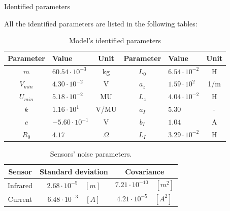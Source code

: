 \begin{frame}{Identified parameters}

    All the identified parameters are listed in the following tables:

    \begin{table}[H]
        \centering
        \begin{tabular}{|c|l|c||c|l|c|}
            \hline
            \textbf{Parameter} & \textbf{Value}        & \textbf{Unit} & \textbf{Parameter} & \textbf{Value}       & \textbf{Unit} \\
            \hline
            $m$                & $60.54 \cdot 10^{-3}$ & kg            & $L_{0}$            & $6.54 \cdot 10^{-2}$ & H             \\
            $V_{min}$          & $4.30 \cdot 10^{-2}$  & V             & $a_{z}$            & $1.59 \cdot 10^{2}$  & 1/m           \\
            $U_{min}$          & $5.18 \cdot 10^{-2}$  & MU            & $L_{z}$            & $4.04 \cdot 10^{-2}$ & H             \\
            $k$                & $1.16 \cdot 10^{1}$   & V/MU          & $a_{I}$            & $5.30$               & -             \\
            $c$                & $-5.60 \cdot 10^{-1}$ & V             & $b_{I}$            & $1.04$               & A             \\
            $R_{0}$            & $4.17$                & $\Omega$      & $L_{I}$            & $3.29 \cdot 10^{-2}$ & H             \\
            \hline
        \end{tabular}

        \caption{Model's identified parameters}
    \end{table}

    \begin{table}[H]
        \centering

        \begin{tabular}{|c|c|c|}
            \hline
            \textbf{Sensor} & \textbf{Standard deviation}    & \textbf{Covariance}               \\
            \hline
            Infrared        & $2.68 \cdot 10^{-5} \quad [m]$ & $7.21 \cdot 10^{-10} \quad [m^2]$ \\
            Current         & $6.48 \cdot 10^{-3} \quad [A]$ & $4.21 \cdot 10^{-5} \quad [A^2]$  \\
            \hline
        \end{tabular}

        \caption{Sensors' noise parameters.}
    \end{table}


\end{frame}